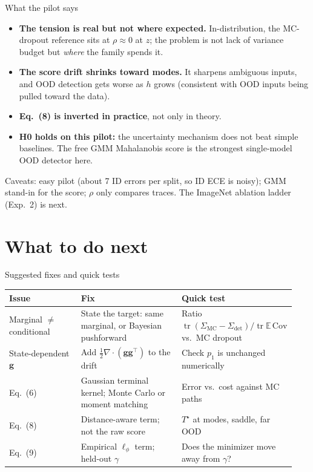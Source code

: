 \documentclass[aspectratio=169,11pt]{beamer}
\newcommand{\E}{\mathbb{E}}
\newcommand{\g}{\bm{g}}
\begin{document}
\begin{frame}{What the pilot says}
  \small
  \begin{itemize}
    \item \textbf{The tension is real but not where expected.} In-distribution, the MC-dropout reference sits at $\rho\approx0$ at $z$; the problem is not lack of variance budget but \emph{where} the family spends it.
    \item \textbf{The score drift shrinks toward modes.} It sharpens ambiguous inputs, and OOD detection gets worse as $h$ grows (consistent with OOD inputs being pulled toward the data).
    \item \textbf{Eq.~(8) is inverted in practice}, not only in theory.
    \item \textbf{H0 holds on this pilot:} the uncertainty mechanism does not beat simple baselines. The free GMM Mahalanobis score is the strongest single-model OOD detector here.
  \end{itemize}
  \smallskip
  {\footnotesize Caveats: easy pilot (about 7 ID errors per split, so ID ECE is noisy); GMM stand-in for the score; $\rho$ only compares traces. The ImageNet ablation ladder (Exp.~2) is next.}
\end{frame}

\section{What to do next}

\begin{frame}{Suggested fixes and quick tests}
  \small
  \begin{tabular}{@{}>{\raggedright\arraybackslash}p{0.25\linewidth}>{\raggedright\arraybackslash}p{0.35\linewidth}>{\raggedright\arraybackslash}p{0.34\linewidth}@{}}
    \toprule
    \textbf{Issue} & \textbf{Fix} & \textbf{Quick test}\\
    \midrule
    Marginal $\neq$ conditional & State the target: same marginal, or Bayesian pushforward & Ratio $\operatorname{tr}(\Sigma_{\mathrm{MC}}-\Sigma_{\mathrm{det}})/\operatorname{tr}\E\,\mathrm{Cov}$ vs.\ MC dropout\\
    State-dependent $\g$ & Add $\tfrac12\nabla\!\cdot(\g\g^\top)$ to the drift & Check $p_1$ is unchanged numerically\\
    Eq.~(6) & Gaussian terminal kernel; Monte Carlo or moment matching & Error vs.\ cost against MC paths\\
    Eq.~(8) & Distance-aware term; not the raw score & $T^\star$ at modes, saddle, far OOD\\
    Eq.~(9) & Empirical $\ell_\phi$ term; held-out $\gamma$ & Does the minimizer move away from $\gamma$?\\
    \bottomrule
  \end{tabular}
\end{frame}
\end{document}
